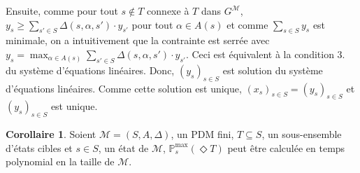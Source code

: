 \documentclass[12pt,a4paper]{report}
\theoremstyle{definition}%
\newtheorem{corollaire}{Corollaire}[chapter]
\theoremstyle{remark}
\newcommand{\pr}{\mathbb{P}}
\begin{document}
%
Ensuite, comme pour tout $s \not \in T$ connexe à $T$ dans $G^\mathcal{M}$,
$y_s \geq \sum_{s' \in S} \Delta(s, \alpha, s') \cdot y_{s'}$ pour tout $\alpha \in A(s)$ et
comme $\sum_{s \in S} y_s$ est minimale, on a intuitivement que
la contrainte est serrée avec
$y_s = \max_{\alpha \in A(s)} \sum_{s' \in S} \Delta(s, \alpha, s') \cdot y_{s'}$. Ceci est équivalent à la condition $3.$ du système d'équations
linéaires.
	Donc, $(y_s)_{s \in S}$ est solution du système d'équations linéaires. Comme
	cette solution est unique, $(x_s)_{s \in S} = (y_s)_{s \in S}$ et $(y_s)_{s
\in S}$ est unique.

\begin{corollaire}
	Soient $\mathcal{M} = (S, A, \Delta)$, un PDM fini, $T \subseteq S$, un
	sous-ensemble d'états cibles et $s \in S$, un état de $\mathcal{M}$,
	$\pr^{\max}_s(\Diamond T)$ peut être calculée en temps polynomial en la taille de $\mathcal{M}$.
\end{corollaire}
\end{document}
